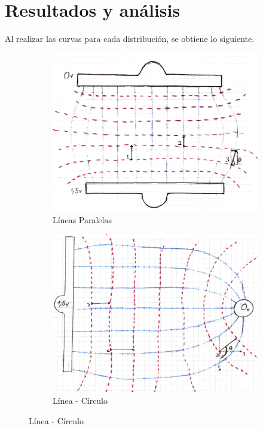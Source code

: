 \documentclass[10pt,twocolumn]{article}
\begin{document}
\section{Resultados y análisis}
Al realizar las curvas para cada distribución, se obtiene lo siguiente.
\begin{figure}[H]
  \centering
  \begin{subfigure}[b]{0.80\linewidth}
    \includegraphics[width=\linewidth]{placas.png}
    \caption{Líneas Paralelas}
  \end{subfigure}
  
  \vspace{8mm}
    \begin{subfigure}[b]{0.80\linewidth}
    \includegraphics[width=\textwidth]{placa-esfera.png}
    \caption{Línea - Círculo}
  \end{subfigure}
  

\end{figure}
\end{document}
